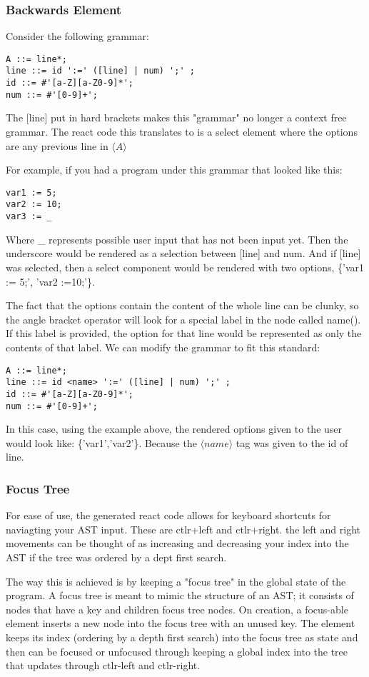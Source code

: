\documentclass[hidelinks,12pt]{article}
\begin{document}
\begin{doublespacing}
\subsubsection*{Backwards Element}
Consider the following grammar:
\begin{verbatim}
A ::= line*;
line ::= id ':=' ([line] | num) ';' ;
id ::= #'[a-Z][a-Z0-9]*';
num ::= #'[0-9]+';
\end{verbatim}
The [line] put in hard brackets makes this "grammar" no longer a context free grammar. The react code this translates to is a select element where the options are any previous line in $\langle A \rangle$

For example, if you had a program under this grammar that looked like this:
\begin{verbatim}
var1 := 5;
var2 := 10;
var3 := _
\end{verbatim}
Where \_ represents possible user input that has not been input yet. Then the underscore would be rendered as a selection between [line] and num. And if [line] was selected, then a select component would be rendered with two options, \{'var1 := 5;', 'var2 :=10;'\}.

The fact that the options contain the content of the whole line can be clunky, so the angle bracket operator will look for a special label in the node called name(). If this label is provided, the option for that line would be represented as only the contents of that label. We can modify the grammar to fit this standard:

\begin{verbatim}
A ::= line*;
line ::= id <name> ':=' ([line] | num) ';' ;
id ::= #'[a-Z][a-Z0-9]*';
num ::= #'[0-9]+';
\end{verbatim}

In this case, using the example above, the rendered options given to the user would look like: \{'var1','var2'\}. Because the $\langle name \rangle$ tag was given to the id of line.


\subsubsection*{Focus Tree}
For ease of use, the generated react code allows for keyboard shortcuts for naviagting your AST input. These are ctlr+left and ctlr+right. the left and right movements can be thought of as increasing and decreasing your index into the AST if the tree was ordered by a dept first search.

The way this is achieved is by keeping a "focus tree" in the global state of the program. A focus tree is meant to mimic the structure of an AST; it consists of nodes that have a key and children focus tree nodes. On creation, a focus-able element inserts a new node into the focus tree with an unused key. The element keeps its index (ordering by a depth first search) into the focus tree as state and then can be focused or unfocused through keeping a global index into the tree that updates through ctlr-left and ctlr-right.

\end{doublespacing}
\end{document}

